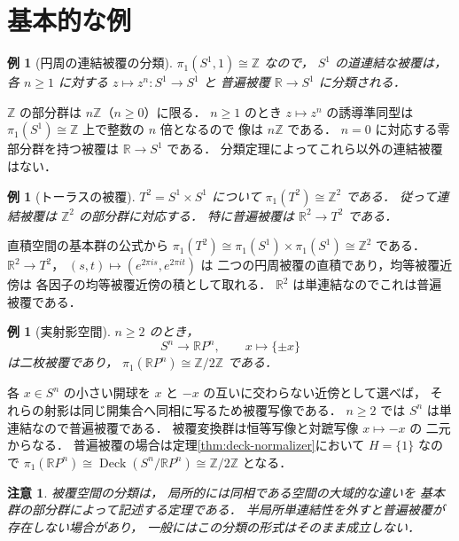 \documentclass[a5paper,10pt,onecolumn]{jsarticle}
\makeatletter
\theoremstyle{mathnotetheorem}
\newtheorem{example}[theorem]{例}
\newtheorem{remark}[theorem]{注意}
\renewcommand{\proofname}{証明}
\renewenvironment{proof}[1][\proofname]{%
  \par\pushQED{\qed}\normalfont\topsep4\p@\@plus2\p@\relax
  \trivlist\item[\hskip\labelsep\bfseries #1]\ignorespaces
}{\popQED\endtrivlist\@endpefalse}
\makeatother
\begin{document}
\section{基本的な例}

\begin{example}[円周の連結被覆の分類]\label{ex:circle}
$\pi_1(S^1,1)\cong\mathbb Z$ なので，
$S^1$ の道連結な被覆は，
各 $n\ge1$ に対する $z\mapsto z^n:S^1\to S^1$ と
普遍被覆 $\mathbb R\to S^1$ に分類される．
\end{example}
\begin{proof}
$\mathbb Z$ の部分群は $n\mathbb Z$（$n\ge0$）に限る．
$n\ge1$ のとき $z\mapsto z^n$ の誘導準同型は
$\pi_1(S^1)\cong\mathbb Z$ 上で整数の $n$ 倍となるので
像は $n\mathbb Z$ である．
$n=0$ に対応する零部分群を持つ被覆は
$\mathbb R\to S^1$ である．
分類定理によってこれら以外の連結被覆はない．
\end{proof}

\begin{example}[トーラスの被覆]\label{ex:torus}
$T^2=S^1\times S^1$ について
$\pi_1(T^2)\cong\mathbb Z^2$ である．
従って連結被覆は $\mathbb Z^2$ の部分群に対応する．
特に普遍被覆は $\mathbb R^2\to T^2$ である．
\end{example}
\begin{proof}
直積空間の基本群の公式から
$\pi_1(T^2)\cong\pi_1(S^1)\times\pi_1(S^1)
\cong\mathbb Z^2$ である．
$\mathbb R^2\to T^2$，
$(s,t)\mapsto(e^{2\pi is},e^{2\pi it})$ は
二つの円周被覆の直積であり，均等被覆近傍は
各因子の均等被覆近傍の積として取れる．
$\mathbb R^2$ は単連結なのでこれは普遍被覆である．
\end{proof}

\begin{example}[実射影空間]\label{ex:projective}
$n\ge2$ のとき，
\[
 S^n\to\mathbb RP^n,\qquad x\mapsto\{\pm x\}
\]
は二枚被覆であり，
$\pi_1(\mathbb RP^n)\cong\mathbb Z/2\mathbb Z$ である．
\end{example}
\begin{proof}
各 $x\in S^n$ の小さい開球を
$x$ と $-x$ の互いに交わらない近傍として選べば，
それらの射影は同じ開集合へ同相に写るため被覆写像である．
$n\ge2$ では $S^n$ は単連結なので普遍被覆である．
被覆変換群は恒等写像と対蹠写像 $x\mapsto-x$ の
二元からなる．
普遍被覆の場合は定理\ref{thm:deck-normalizer}において
$H=\{1\}$ なので
$\pi_1(\mathbb RP^n)\cong\operatorname{Deck}(S^n/\mathbb RP^n)
\cong\mathbb Z/2\mathbb Z$ となる．
\end{proof}

\begin{remark}
被覆空間の分類は，
局所的には同相である空間の大域的な違いを
基本群の部分群によって記述する定理である．
半局所単連結性を外すと普遍被覆が存在しない場合があり，
一般にはこの分類の形式はそのまま成立しない．
\end{remark}
\end{document}
